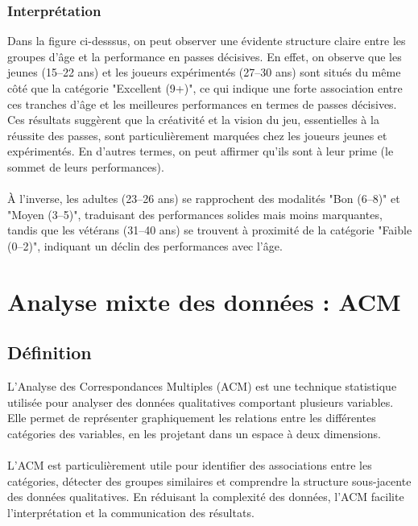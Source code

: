 \documentclass[12pt]{scrartcl}
\begin{document}
            \subsubsection{Interprétation}
                Dans la figure ci-desssus, on peut observer une évidente structure claire entre les groupes d’âge et la performance en passes décisives. En effet, on observe que les jeunes (15–22 ans) et les joueurs expérimentés (27–30 ans) sont situés du même côté que la catégorie "Excellent (9+)", ce qui indique une forte association entre ces tranches d’âge et les meilleures performances en termes de passes décisives. Ces résultats suggèrent que la créativité et la vision du jeu, essentielles à la réussite des passes, sont particulièrement marquées chez les joueurs jeunes et expérimentés. En d'autres termes, on peut affirmer qu'ils sont à leur prime (le sommet de leurs performances).\\\\
                À l’inverse, les adultes (23–26 ans) se rapprochent des modalités "Bon (6–8)" et "Moyen (3–5)", traduisant des performances solides mais moins marquantes, tandis que les vétérans (31–40 ans) se trouvent à proximité de la catégorie "Faible (0–2)", indiquant un déclin des performances avec l’âge.



    \section{Analyse mixte des données : ACM}

        \subsection{Définition}
            L'Analyse des Correspondances Multiples (ACM) est une technique statistique utilisée pour analyser des données qualitatives comportant plusieurs variables. Elle permet de représenter graphiquement les relations entre les différentes catégories des variables, en les projetant dans un espace à deux dimensions.\\\\
            L'ACM est particulièrement utile pour identifier des associations entre les catégories, détecter des groupes similaires et comprendre la structure sous-jacente des données qualitatives. En réduisant la complexité des données, l'ACM facilite l'interprétation et la communication des résultats.
\end{document}
